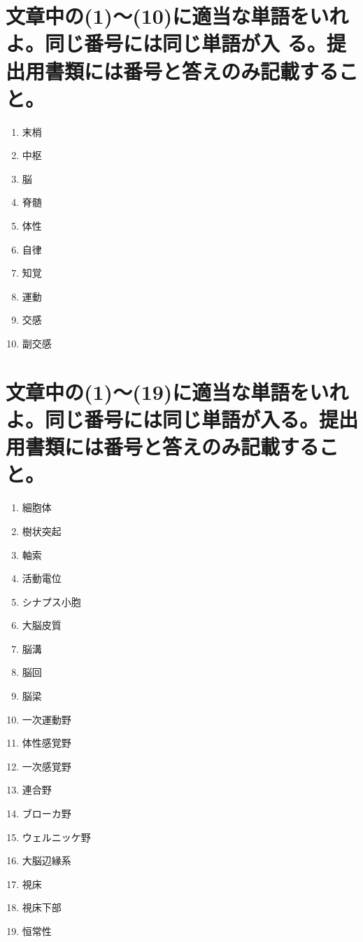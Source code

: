 \documentclass[titlepage,a4paper]{jsarticle}
\begin{document}
\section{文章中の(1)〜(10)に適当な単語をいれよ。同じ番号には同じ単語が入 る。提出用書類には番号と答えのみ記載すること。}%
\begin{enumerate}
  \item 末梢
  \item 中枢
  \item 脳
  \item 脊髄
  \item 体性
  \item 自律
  \item 知覚
  \item 運動
  \item 交感
  \item 副交感
\end{enumerate}
\section{文章中の(1)〜(19)に適当な単語をいれよ。同じ番号には同じ単語が入る。提出用書類には番号と答えのみ記載すること。}%
\begin{enumerate}
  \item 細胞体
  \item 樹状突起
  \item 軸索
  \item 活動電位
  \item シナプス小胞
  \item 大脳皮質
  \item 脳溝
  \item 脳回
  \item 脳梁
  \item 一次運動野
  \item 体性感覚野
  \item 一次感覚野
  \item 連合野
  \item ブローカ野
  \item ウェルニッケ野
  \item 大脳辺縁系
  \item 視床
  \item 視床下部
  \item 恒常性
\end{enumerate}
\end{document}
